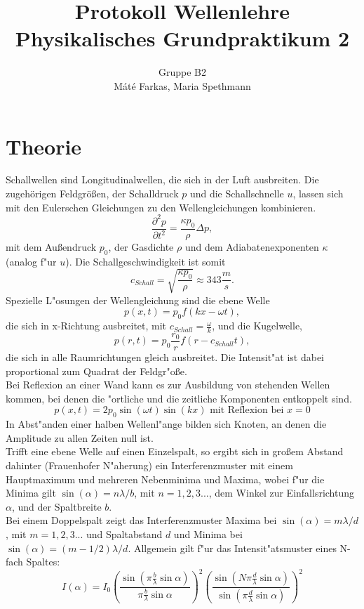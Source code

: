 \documentclass[12pt,a4paper]{article}
\author{Gruppe B2 \\ Máté Farkas, Maria Spethmann}
\title{Protokoll Wellenlehre \\ Physikalisches Grundpraktikum 2}
\begin{document}
	\maketitle\thispagestyle{empty} %
	\newpage
	\pagestyle{headings} %
	\tableofcontents
	\newpage

\section{Theorie}

Schallwellen sind Longitudinalwellen, die sich in der Luft ausbreiten. Die zugehörigen Feldgrößen, der Schalldruck $p$ und die Schallschnelle $u$, lassen sich mit den Eulerschen Gleichungen zu den Wellengleichungen kombinieren.
\begin{equation}
\frac{\partial^2p}{\partial t^2}=\frac{\kappa p_0}{\rho}\Delta p,
\end{equation}
mit dem Außendruck $p_0$, der Gasdichte $\rho$ und dem Adiabatenexponenten $\kappa$ (analog f"ur $u$).
Die Schallgeschwindigkeit ist somit
\begin{equation}
c_{Schall}=\sqrt{\frac{\kappa p_0}{\rho}}\approx343\frac{m}{s}.
\end{equation}
Spezielle L"osungen der Wellengleichung sind die ebene Welle
\begin{equation}
p(x,t)=p_0f(kx-\omega t),
\end{equation}
die sich in x-Richtung ausbreitet, mit $c_{Schall}=\frac{\omega}{k}$, und die Kugelwelle,
\begin{equation}
p(r,t)=p_0\frac{r_0}{r}f(r-c_{Schall}t),
\end{equation}
die sich in alle Raumrichtungen gleich ausbreitet. Die Intensit"at ist dabei proportional zum Quadrat der Feldgr"o\ss e.\\
Bei Reflexion an einer Wand kann es zur Ausbildung von stehenden Wellen kommen, bei denen die "ortliche und die zeitliche Komponenten entkoppelt sind. 
\begin{equation}
p(x,t)=2p_0\sin(\omega t)\sin(kx)\text{\ \ \ \ mit Reflexion bei }x=0
\end{equation}
In Abst"anden einer halben Wellenl"ange bilden sich Knoten, an denen die Amplitude zu allen Zeiten null ist.\\
Trifft eine ebene Welle auf einen Einzelspalt, so ergibt sich in gro\ss em Abstand dahinter (Frauenhofer N"aherung) ein Interferenzmuster mit einem Hauptmaximum und mehreren Nebenminima und Maxima, wobei f"ur die Minima gilt $\sin(\alpha)=n\lambda/b$, mit $n=1,2,3...$, dem Winkel zur Einfallsrichtung $\alpha$, und der Spaltbreite $b$.\\
Bei einem Doppelspalt zeigt das Interferenzmuster Maxima bei $\sin(\alpha)=m\lambda/d$, mit $m=1,2,3...$ und Spaltabstand $d$ und Minima bei $\sin(\alpha)=(m-1/2)\lambda/d$.
Allgemein gilt f"ur das Intensit"atsmuster eines N-fach Spaltes:
\begin{equation}
I(\alpha)=I_0\left(\frac{\sin(\pi\frac{b}{\lambda}\sin\alpha)}{\pi\frac{b}{\lambda}\sin\alpha}\right)^2\left(\frac{\sin(N\pi\frac{d}{\lambda}\sin\alpha)}{\sin(\pi\frac{d}{\lambda}\sin\alpha)}\right)^2
\end{equation}
\end{document}

